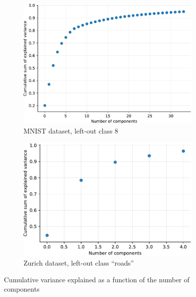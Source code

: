 \documentclass[10pt]{article}
\begin{document}
\begin{figure}[H]
    \centering
    \begin{subfigure}{.45\textwidth}
        \centering
        \includegraphics[width=\textwidth]{MNIST_pca_components_wo_cl_8}
        \caption{\gls{MNIST} dataset, left-out class 8}
        \label{fig:pca_components_mnist}
    \end{subfigure}
    \begin{subfigure}{.45\textwidth}
        \centering
        \includegraphics[width=\textwidth]{ZH_pca_components_wo_cl_1}
        \caption{Zurich dataset, left-out class ``roads''}
        \label{fig:pca_components_zurich}
    \end{subfigure}
    \caption{Cumulative variance explained as a function of the number of components}
    \label{fig:pca_components}
\end{figure}
\end{document}
